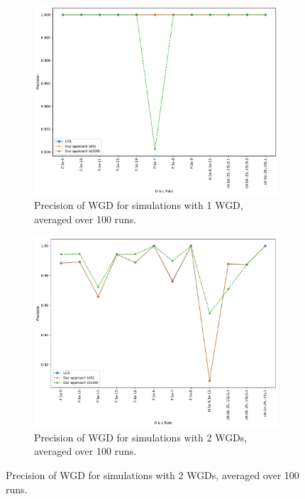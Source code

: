 \documentclass[10pt]{article}
\begin{document}
\begin{figure}[h!]
    \begin{subfigure}[b]{0.48\textwidth}
        \centering
        \includegraphics[width=\textwidth]{figs/precision-WGD-t10-t80-Avg.pdf}
        \caption{Precision of WGD for simulations with 1 WGD, averaged over 100 runs.}
        \label{fig:precision-wgd-1wgd}
    \end{subfigure}
    \hfill
    \begin{subfigure}[b]{0.48\textwidth}
        \centering
        \includegraphics[width=\textwidth]{figs/precision-2W-WGD-t20-t80-Avg.pdf}
        \caption{Precision of WGD for simulations with 2 WGDs, averaged over 100 runs.}
        \label{fig:precision-wgd-2wgd}
    \end{subfigure}
    

\end{figure}
\end{document}
